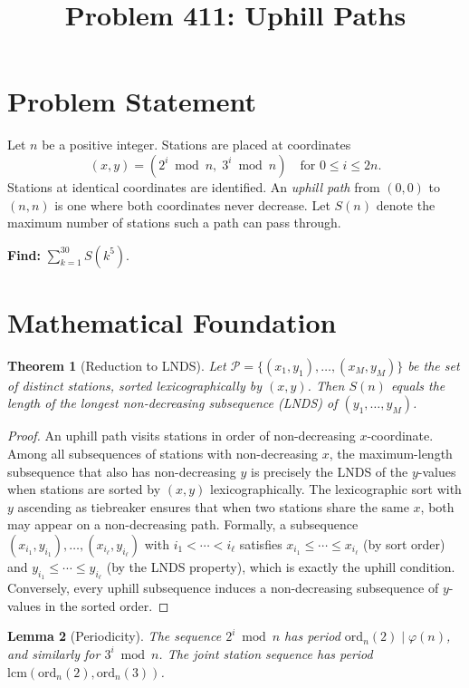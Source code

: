 \documentclass[11pt]{article}
\title{Problem 411: Uphill Paths}
\author{}
\date{}
\newtheorem{theorem}{Theorem}
\newtheorem{lemma}[theorem]{Lemma}
\begin{document}
\maketitle

\section{Problem Statement}

Let $n$ be a positive integer. Stations are placed at coordinates
\[
  (x, y) = (2^i \bmod n, \; 3^i \bmod n) \quad \text{for } 0 \le i \le 2n.
\]
Stations at identical coordinates are identified. An \emph{uphill path} from $(0,0)$ to $(n,n)$ is one where both coordinates never decrease. Let $S(n)$ denote the maximum number of stations such a path can pass through.

\textbf{Find:} $\displaystyle\sum_{k=1}^{30} S(k^5)$.

\section{Mathematical Foundation}

\begin{theorem}[Reduction to LNDS]
Let $\mathcal{P} = \{(x_1,y_1),\dots,(x_M,y_M)\}$ be the set of distinct stations, sorted lexicographically by $(x,y)$. Then $S(n)$ equals the length of the longest non-decreasing subsequence (LNDS) of $(y_1,\dots,y_M)$.
\end{theorem}

\begin{proof}
An uphill path visits stations in order of non-decreasing $x$-coordinate. Among all subsequences of stations with non-decreasing $x$, the maximum-length subsequence that also has non-decreasing $y$ is precisely the LNDS of the $y$-values when stations are sorted by $(x,y)$ lexicographically. The lexicographic sort with $y$ ascending as tiebreaker ensures that when two stations share the same $x$, both may appear on a non-decreasing path. Formally, a subsequence $(x_{i_1},y_{i_1}),\dots,(x_{i_\ell},y_{i_\ell})$ with $i_1 < \cdots < i_\ell$ satisfies $x_{i_1} \le \cdots \le x_{i_\ell}$ (by sort order) and $y_{i_1} \le \cdots \le y_{i_\ell}$ (by the LNDS property), which is exactly the uphill condition. Conversely, every uphill subsequence induces a non-decreasing subsequence of $y$-values in the sorted order.
\end{proof}

\begin{lemma}[Periodicity]
The sequence $2^i \bmod n$ has period $\mathrm{ord}_n(2) \mid \varphi(n)$, and similarly for $3^i \bmod n$. The joint station sequence has period $\mathrm{lcm}(\mathrm{ord}_n(2), \mathrm{ord}_n(3))$.
\end{lemma}
\end{document}
